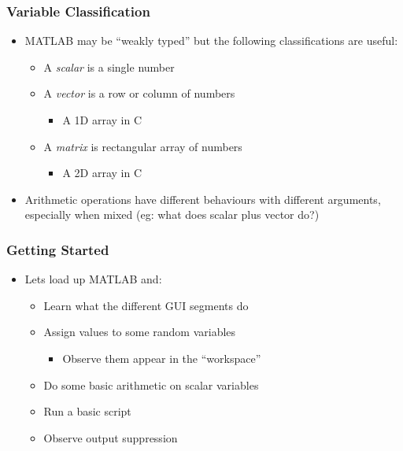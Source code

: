 \documentclass[14pt]{beamer}
\begin{document}
\begin{frame}
\frametitle{Variable Classification}
\begin{itemize}
\item MATLAB may be ``weakly typed'' but the following classifications are useful:
	\begin{itemize}
		\item A \textit{scalar} is a single number
		\item A \textit{vector} is a row or column of numbers 
		\begin{itemize}
			\item A 1D array in C
		\end{itemize}
		\item A \textit{matrix} is rectangular array of numbers
		\begin{itemize}
			\item A 2D array in C
		\end{itemize} 
	\end{itemize}
\pause
\item Arithmetic operations have different behaviours with different arguments, especially when mixed (eg: what does scalar plus vector do?)
\end{itemize}
\end{frame}

\begin{frame}
\frametitle{Getting Started}
\begin{itemize}
\item Lets load up MATLAB and:
	\begin{itemize}
		\item Learn what the different GUI segments do
		\item Assign values to some random variables
			\begin{itemize}
				\item Observe them appear in the ``workspace''
			\end{itemize}
		\item Do some basic arithmetic on scalar variables
		\item Run a basic script
		\item Observe output suppression
	\end{itemize}
\end{itemize}
\end{frame}
\end{document}
